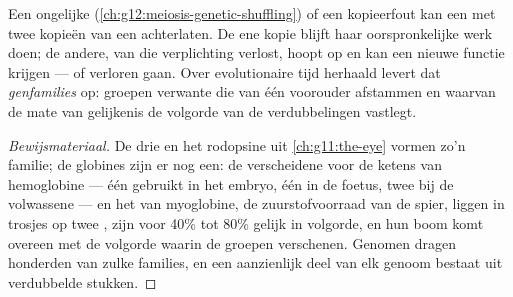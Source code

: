 \begin{proposition}\label{prop:g12:diversification-of-life:duplication}
Een ongelijke  (\cref{ch:g12:meiosis-genetic-shuffling}) of
een kopieerfout kan een  met twee kopieën van een 
achterlaten. De ene kopie blijft haar oorspronkelijke werk doen; de
andere, van die verplichting verlost, hoopt  op en kan een nieuwe
functie krijgen --- of verloren gaan. Over evolutionaire tijd herhaald
levert dat \emph{genfamilies} op: groepen verwante 
die van één voorouder afstammen en waarvan de mate van gelijkenis de
volgorde van de verdubbelingen vastlegt.
\end{proposition}
\begin{proof}[Bewijsmateriaal]
De drie  en het rodopsine uit \cref{ch:g11:the-eye} vormen zo'n
familie; de globines zijn er nog een: de verscheidene  voor de
ketens van hemoglobine --- één gebruikt in het embryo, één in de foetus,
twee bij de volwassene --- en het  van myoglobine, de zuurstofvoorraad
van de spier, liggen in trosjes op twee , zijn voor 40\% tot
80\% gelijk in volgorde, en hun boom komt overeen met de volgorde waarin
de groepen  verschenen. Genomen dragen honderden van zulke
families, en een aanzienlijk deel van elk genoom bestaat uit verdubbelde
stukken.
\end{proof}

